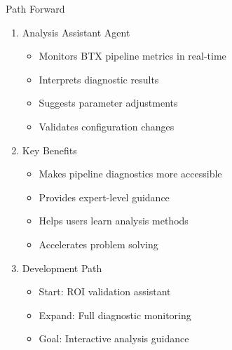 \documentclass{beamer}
\begin{document}
\begin{frame}{Path Forward}
    \begin{enumerate}
        \item Analysis Assistant Agent
        \begin{itemize}
            \item Monitors BTX pipeline metrics in real-time
            \item Interprets diagnostic results
            \item Suggests parameter adjustments
            \item Validates configuration changes
        \end{itemize}
        
        \item Key Benefits
        \begin{itemize}
            \item Makes pipeline diagnostics more accessible
            \item Provides expert-level guidance
            \item Helps users learn analysis methods
            \item Accelerates problem solving
        \end{itemize}
        
        \item Development Path
        \begin{itemize}
            \item Start: ROI validation assistant
            \item Expand: Full diagnostic monitoring
            \item Goal: Interactive analysis guidance
        \end{itemize}
    \end{enumerate}
\end{frame}
\end{document}
